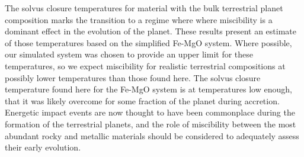 The solvus closure temperatures for material with the bulk terrestrial planet composition
marks the transition to a regime where where miscibility is a dominant effect in the
evolution of the planet. These results present an estimate of those temperatures based on
the simplified Fe-MgO system. Where possible, our simulated system was chosen to provide
an upper limit for these temperatures, so we expect miscibility for realistic terrestrial
compositions at possibly lower temperatures than those found here. The solvus closure
temperature found here for the Fe-MgO system is at temperatures low enough, that it was
likely overcome for some fraction of the planet during accretion. Energetic impact events
are now thought to have been commonplace during the formation of the terrestrial planets,
and the role of miscibility between the most abundant rocky and metallic materials should
be considered to adequately assess their early evolution.
